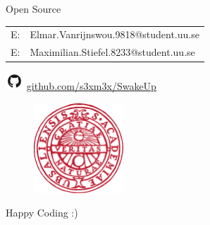 \documentclass[apectratio=169]{beamer}
\begin{document}
  	\begin{frame}{Open Source}
        	\begin{center}
                \begin{table}[]
                        \begin{tabular}{ll}
                                E: & Elmar.Vanrijnswou.9818@student.uu.se \\
                                E: & Maximilian.Stiefel.8233@student.uu.se\\
                        \end{tabular}
                \end{table}
                \includegraphics[width=0.05\textwidth]{./fig/github} \hspace{0.1cm} \url{github.com/s3xm3x/SwakeUp}\\
        	\end{center}
        	\begin{figure}
                	\includegraphics[width=0.3\textwidth]{./fig/logo}
        	\end{figure}
  	\end{frame}


  \begin{frame}[standout]
	Happy Coding :) 
  \end{frame}
\end{document}
